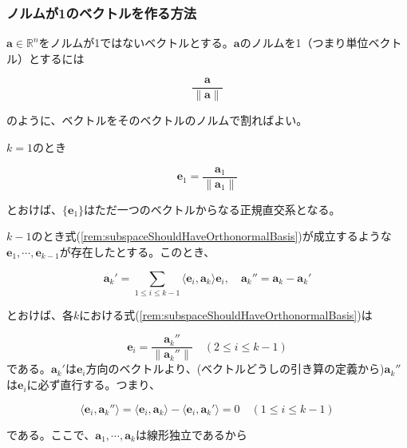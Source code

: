 \documentclass[dvipdfmx,autodetect-engine]{jsarticle}
\theoremstyle{definition}
\newcommand{\vecSpace}[1]{\mathbb{R}^{#1}}
\begin{document}
\subsubsection{ノルムが1のベクトルを作る方法}

$\bm{a} \in \vecSpace{n}$をノルムが1ではないベクトルとする。$\bm{a}$のノルムを1（つまり単位ベクトル）とするには

$$
\frac{\bm{a}}{\|\bm{a}\|}
$$

のように、ベクトルをそのベクトルのノルムで割ればよい。

\label{rem:schmidtOrthonormalization}

$k = 1$のとき

\begin{equation}
\bm{e}_1 = \frac{\bm{a}_1}{\|\bm{a}_1\|}
\label{rem:subspaceShouldHaveOrthonormalBasis}
\end{equation}

とおけば、$\{\bm{e}_1\}$はただ一つのベクトルからなる正規直交系となる。

$k - 1$のとき式(\ref{rem:subspaceShouldHaveOrthonormalBasis})が成立するような$\bm{e}_1, \cdots, \bm{e}_{k-1}$が存在したとする。このとき、

$$
\bm{a}_k' = \sum_{1 \leq i \leq k -1} \langle \bm{e}_i, \bm{a}_k \rangle \bm{e}_i, \quad \bm{a}_k'' = \bm{a}_k - \bm{a}_k'
$$

とおけば、各$k$における式(\ref{rem:subspaceShouldHaveOrthonormalBasis})は

$$
\bm{e}_i = \frac{\bm{a}_k''}{\| \bm{a}_k'' \|} \quad (2 \leq i \leq k - 1)
$$
である。$\bm{a}_k'$は$\bm{e}_i$方向のベクトルより、(ベクトルどうしの引き算の定義から)$\bm{a}_k''$は$\bm{e}_i$に必ず直行する。つまり、

$$
\langle \bm{e}_i, \bm{a}_k'' \rangle = \langle \bm{e}_i, \bm{a}_k \rangle - \langle \bm{e}_i, \bm{a}_k' \rangle = 0 \quad (1 \leq i \leq k - 1)
$$

である。ここで、$\bm{a}_1, \cdots, \bm{a}_k$は線形独立であるから
\end{document}
